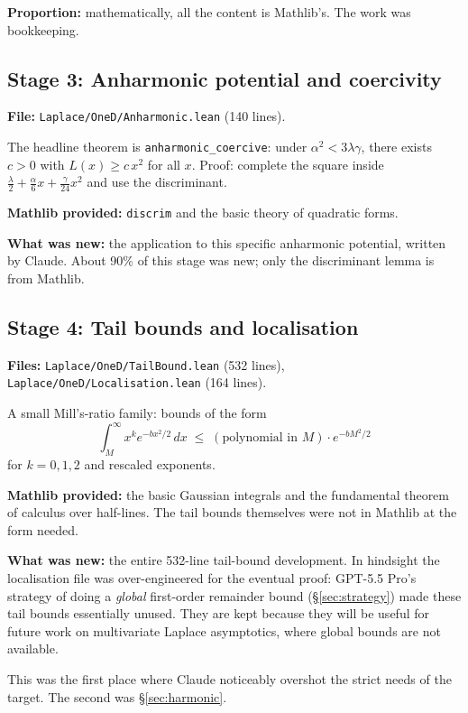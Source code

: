 \documentclass[11pt]{article}
\begin{document}
\textbf{Proportion:} mathematically, all the content is Mathlib's. The
work was bookkeeping.

\subsection{Stage 3: Anharmonic potential and coercivity}

\textbf{File:} \texttt{Laplace/OneD/Anharmonic.lean} (140 lines).

The headline theorem is \texttt{anharmonic\_coercive}: under
$\alpha^2 < 3\lambda\gamma$, there exists $c > 0$ with $L(x) \ge c\,x^2$
for all $x$. Proof: complete the square inside
$\frac{\lambda}{2} + \frac{\alpha}{6}x + \frac{\gamma}{24}x^2$ and use
the discriminant.

\textbf{Mathlib provided:} \texttt{discrim} and the basic theory of
quadratic forms.

\textbf{What was new:} the application to this specific anharmonic
potential, written by Claude. About 90\% of this stage was new; only the
discriminant lemma is from Mathlib.

\subsection{Stage 4: Tail bounds and localisation}

\textbf{Files:} \texttt{Laplace/OneD/TailBound.lean} (532 lines),
\texttt{Laplace/OneD/Localisation.lean} (164 lines).

A small Mill's-ratio family: bounds of the form
\[
  \int_M^\infty x^k e^{-bx^2/2}\,dx \;\le\; (\text{polynomial in } M)
                                     \cdot e^{-bM^2/2}
\]
for $k = 0, 1, 2$ and rescaled exponents.

\textbf{Mathlib provided:} the basic Gaussian integrals and the
fundamental theorem of calculus over half-lines. The tail bounds
themselves were not in Mathlib at the form needed.

\textbf{What was new:} the entire 532-line tail-bound development. In
hindsight the localisation file was over-engineered for the eventual
proof: GPT-5.5 Pro's strategy of doing a \emph{global} first-order
remainder bound (\S\ref{sec:strategy}) made these tail bounds essentially
unused. They are kept because they will be useful for future work on
multivariate Laplace asymptotics, where global bounds are not available.

This was the first place where Claude noticeably overshot the strict
needs of the target. The second was \S\ref{sec:harmonic}.
\end{document}
